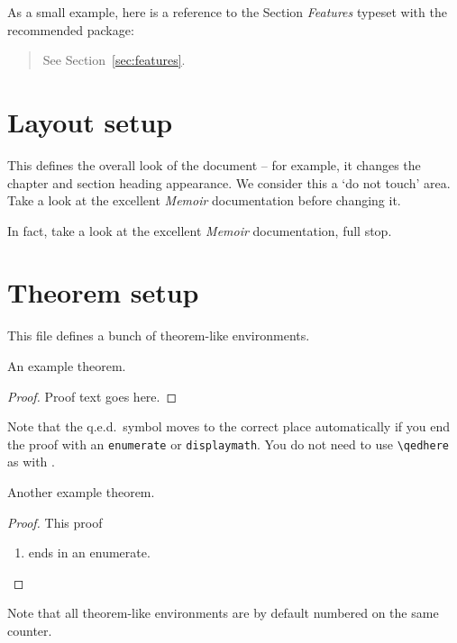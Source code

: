 As a small example, here is a reference to the Section \emph{Features}
typeset with the recommended  package:
\begin{quote}
  See Section~\vref{sec:features}.
\end{quote}


\chapter{Layout setup}

This defines the overall look of the document -- for example, it
changes the chapter and section heading appearance.  We consider this
a `do not touch' area.  Take a look at the excellent \emph{Memoir}
documentation before changing it.

In fact, take a look at the excellent \emph{Memoir} documentation,
full stop.


\chapter{Theorem setup}

This file defines a bunch of theorem-like environments.

\begin{theorem}
  An example theorem.
\end{theorem}

\begin{proof}
  Proof text goes here.
\end{proof}

Note that the q.e.d.\ symbol moves to the correct place automatically
if you end the proof with an \texttt{enumerate} or
\texttt{displaymath}.  You do not need to use \verb-\qedhere- as with
.

\begin{theorem}
  Another example theorem.
\end{theorem}

\begin{proof}
  This proof
  \begin{enumerate}
  \item ends in an enumerate.
  \end{enumerate}
\end{proof}

\begin{proposition}
  Note that all theorem-like environments are by default numbered on
  the same counter.
\end{proposition}

